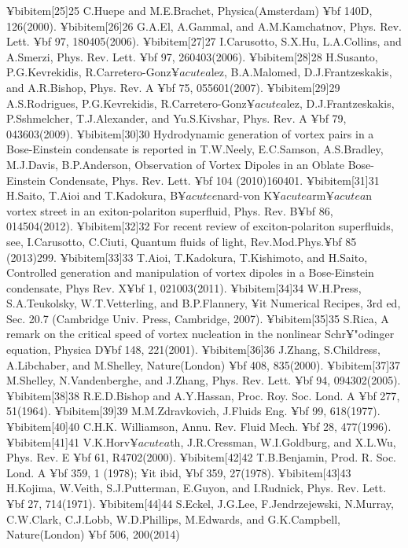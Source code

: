 {{{{{¥bibitem[25]{25} C.Huepe and M.E.Brachet, Physica(Amsterdam) {¥bf 140D}, 126(2000).
¥bibitem[26]{26} G.A.El, A.Gammal, and A.M.Kamchatnov, Phys. Rev. Lett. {¥bf 97}, 180405(2006).
¥bibitem[27]{27} I.Carusotto, S.X.Hu, L.A.Collins, and A.Smerzi, Phys. Rev. Lett. {¥bf 97}, 260403(2006).
¥bibitem[28]{28} H.Susanto, P.G.Kevrekidis, R.Carretero-Gonz$¥acute{a}$lez, B.A.Malomed, D.J.Frantzeskakis, and A.R.Bishop, Phys. Rev. A {¥bf 75}, 055601(2007).
¥bibitem[29]{29} A.S.Rodrigues, P.G.Kevrekidis, R.Carretero-Gonz$¥acute{a}$lez, D.J.Frantzeskakis, P.Sshmelcher, T.J.Alexander, and Yu.S.Kivshar, Phys. Rev. A {¥bf 79}, 043603(2009).
¥bibitem[30]{30} Hydrodynamic generation of vortex pairs in a Bose-Einstein condensate is reported in T.W.Neely, E.C.Samson, A.S.Bradley, M.J.Davis, B.P.Anderson, Observation of Vortex Dipoles in an Oblate Bose-Einstein Condensate, Phys. Rev. Lett. {¥bf 104} (2010)160401.
¥bibitem[31]{31} H.Saito, T.Aioi and T.Kadokura, B$¥acute{e}$nard-von K$¥acute{a}$rm$¥acute{a}$n vortex street in an exiton-polariton superfluid, Phys. Rev. B{¥bf 86}, 014504(2012).
¥bibitem[32]{32} For recent review of exciton-polariton superfluids, see, I.Carusotto, C.Ciuti, Quantum fluids of light, Rev.Mod.Phys.{¥bf 85} (2013)299.
¥bibitem[33]{33} T.Aioi, T.Kadokura, T.Kishimoto, and H.Saito, Controlled generation and manipulation of vortex dipoles in a Bose-Einstein condensate, Phys Rev. X{¥bf 1}, 021003(2011).
¥bibitem[34]{34} W.H.Press, S.A.Teukolsky, W.T.Vetterling, and B.P.Flannery, {¥it Numerical Recipes}, 3rd ed, Sec. 20.7 (Cambridge Univ. Press, Cambridge, 2007).
¥bibitem[35]{35} S.Rica, A remark on the critical speed of vortex nucleation in the nonlinear Schr¥"{o}dinger equation, Physica D{¥bf 148}, 221(2001).
¥bibitem[36]{36} J.Zhang, S.Childress, A.Libchaber, and M.Shelley, Nature(London) {¥bf 408}, 835(2000).
¥bibitem[37]{37} M.Shelley, N.Vandenberghe, and J.Zhang, Phys. Rev. Lett. {¥bf 94}, 094302(2005).
¥bibitem[38]{38} R.E.D.Bishop and A.Y.Hassan, Proc. Roy. Soc. Lond. A {¥bf 277}, 51(1964).
¥bibitem[39]{39} M.M.Zdravkovich, J.Fluids Eng. {¥bf 99}, 618(1977).
¥bibitem[40]{40} C.H.K. Williamson, Annu. Rev. Fluid Mech. {¥bf 28}, 477(1996).
¥bibitem[41]{41} V.K.Horv$¥acute{a}$th, J.R.Cressman, W.I.Goldburg, and X.L.Wu, Phys. Rev. E {¥bf 61}, R4702(2000).
¥bibitem[42]{42} T.B.Benjamin, Prod. R. Soc. Lond. A {¥bf 359}, 1 (1978); {¥it ibid}, {¥bf 359}, 27(1978).
¥bibitem[43]{43} H.Kojima, W.Veith, S.J.Putterman, E.Guyon, and I.Rudnick, Phys. Rev. Lett. {¥bf 27}, 714(1971).
¥bibitem[44]{44} S.Eckel, J.G.Lee, F.Jendrzejewski, N.Murray, C.W.Clark, C.J.Lobb, W.D.Phillips, M.Edwards, and G.K.Campbell, Nature(London) {¥bf 506}, 200(2014)
}}}}}

